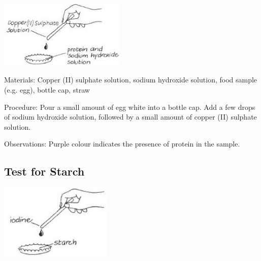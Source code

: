\begin{multicols}{2}
\begin{center}
\includegraphics[width=0.45\textwidth]{./img/vso/food-test-protein.jpg}
\end{center}

\begin{description*}
\item[Materials:]{Copper (II) sulphate solution, sodium hydroxide solution, food sample (e.g. egg), bottle cap, straw}
\item[Procedure:]{Pour a small amount of egg white into a bottle cap. Add a few drops of sodium hydroxide solution, followed by a small amount of copper (II) sulphate solution.}
\item[Observations:]{Purple colour indicates the presence of protein in the sample.}
\end{description*}

\subsection{Test for Starch} %

\begin{center}
\includegraphics[width=0.4\textwidth]{./img/vso/food-test-starch.jpg}
\end{center}


\end{multicols}
